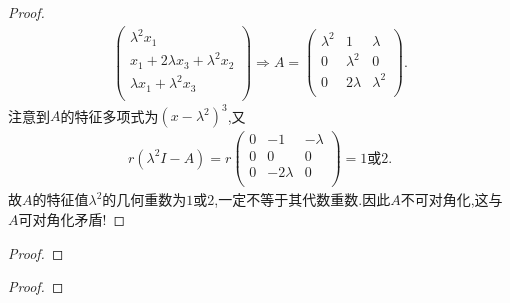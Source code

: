 \documentclass[../../main.tex]{subfiles}
\begin{document}
\begin{proof}
\begin{align*}
\begin{pmatrix}
\lambda^2x_1\\
x_1+2\lambda x_3+\lambda^2x_2\\
\lambda x_1+\lambda^2x_3\\
\end{pmatrix}\Longrightarrow A=\begin{pmatrix}
\lambda^2&		1&		\lambda\\
0&		\lambda^2&		0\\
0&		2\lambda&		\lambda^2\\
\end{pmatrix}.
\end{align*}
注意到$A$的特征多项式为$(x-\lambda^2)^3$,又
\begin{align*}
r(\lambda^2I-A)=r\begin{pmatrix}
0&		-1&		-\lambda\\
0&		0&		0\\
0&		-2\lambda&		0\\
\end{pmatrix}=1\text{或}2.
\end{align*}
故$A$的特征值$\lambda^2$的几何重数为$1$或$2$,一定不等于其代数重数.因此$A$不可对角化,这与$A$可对角化矛盾!

\end{proof}

\begin{example}

\end{example}
\begin{proof}


\end{proof}

\begin{example}

\end{example}
\begin{proof}


\end{proof}
\end{document}
